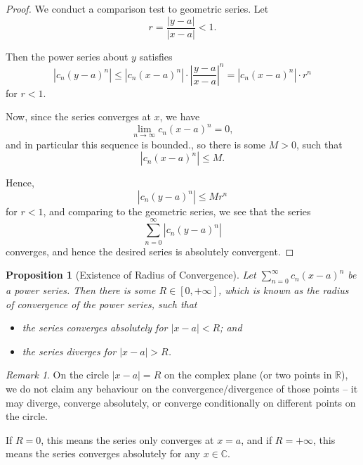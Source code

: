 \documentclass[11pt]{article}
\numberwithin{equation}{section}
\newtheorem{proposition}[theorem]{Proposition}
\theoremstyle{definition}
\theoremstyle{remark}
\newtheorem{remark}[theorem]{Remark}
\newcommand{\pqty}[1]{\left(#1\right)}
\newcommand{\abs}[1]{\left|#1\right|}
\newcommand{\ccintv}[2]{[#1,#2]}
\newcommand{\RR}{\mathbb R}
\newcommand{\CC}{\mathbb C}
\newcommand{\plusinfty}{+\infty}
\begin{document}
\begin{proof}
    We conduct a comparison test to geometric series. Let
    \[
        r = \frac{\abs{y - a}}{\abs{x - a}} < 1.
    \]

    Then the power series about \(y\) satisfies
    \[
        \abs{c_n \pqty{y - a}^{n}} \leq \abs{c_n \pqty{x - a}^{n}} \cdot \abs{\frac{y - a}{x - a}}^n = \abs{c_n \pqty{x - a}^{n}} \cdot r^n
    \]
    for \(r < 1\).

    Now, since the series converges at \(x\), we have
    \[
        \lim_{n \to \infty} c_n \pqty{x - a}^{n} = 0,
    \]
    and in particular this sequence is bounded., so there is some \(M > 0\), such that
    \[
        \abs{c_n \pqty{x - a}^{n}} \leq M.
    \]

    Hence,
    \[
        \abs{c_n \pqty{y - a}^n} \leq M r^n
    \]
    for \(r < 1\), and comparing to the geometric series, we see that the series
    \[
        \sum_{n = 0}^{\infty} \abs{c_n \pqty{y - a}^{n}}
    \]
    converges, and hence the desired series is absolutely convergent.
\end{proof}

\begin{proposition}[Existence of Radius of Convergence]\label{analysis-unit-0204}
    \label{prop:existence-radius-convergence}%
    Let \(\sum_{n = 0}^{\infty} c_n \pqty{x - a}^{n}\) be a power series. Then there is some \(R \in \ccintv{0}{\plusinfty}\), which is known as the \emph{radius of convergence} of the power series, such that
    \begin{itemize}
        \item the series converges absolutely for \(\abs{x - a} < R\); and
        \item the series diverges for \(\abs{x - a} > R\).
    \end{itemize}
\end{proposition}

\begin{remark}\label{analysis-unit-0205}
    On the circle \(\abs{x - a} = R\) on the complex plane (or two points in \(\RR\)), we do not claim any behaviour on the convergence/divergence of those points -- it may diverge, converge absolutely, or converge conditionally on different points on the circle.
\end{remark}

If \(R = 0\), this means the series only converges at \(x = a\), and if \(R = \plusinfty\), this means the series converges absolutely for any \(x \in \CC\).
\end{document}
